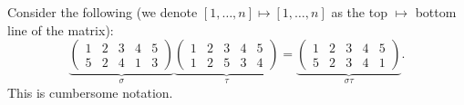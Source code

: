 \documentclass[12pt,oneside]{article}
\begin{document}
\begin{example}[Permutations, $n = 5$]
  Consider the following (we denote $[1, \dots, n] \mapsto [1, \dots, n]$ as the top $\mapsto$ bottom line of the matrix):
  \[
  \underbrace{\begin{pmatrix}
    1 & 2 & 3 &4 &5\\
    5 & 2 & 4 & 1 & 3
  \end{pmatrix}}_{\sigma}\underbrace{\begin{pmatrix}
    1 & 2 &3 &4 &5\\
    1 & 2& 5 & 3 &4
  \end{pmatrix}}_{\tau}=
  \underbrace{\begin{pmatrix}
    1 & 2 & 3 &4 &5\\
    5 & 2 &3 &4 & 1
  \end{pmatrix}}_{\sigma \tau}.
  \]
  This is cumbersome notation.
\end{example}
\end{document}

